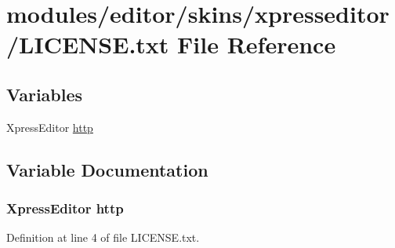 \hypertarget{LICENSE_8txt}{}\section{modules/editor/skins/xpresseditor/\+L\+I\+C\+E\+N\+SE.txt File Reference}
\label{LICENSE_8txt}
\subsection*{Variables}
\begin{DoxyCompactItemize}
\item 
Xpress\+Editor \hyperlink{LICENSE_8txt_ac4b61a1f8e5f59d19b9a24b25b336db1}{http}
\end{DoxyCompactItemize}


\subsection{Variable Documentation}
\subsubsection[{\texorpdfstring{http}{http}}]{\setlength{\rightskip}{0pt plus 5cm}Xpress\+Editor http}\hypertarget{LICENSE_8txt_ac4b61a1f8e5f59d19b9a24b25b336db1}{}\label{LICENSE_8txt_ac4b61a1f8e5f59d19b9a24b25b336db1}


Definition at line 4 of file L\+I\+C\+E\+N\+S\+E.\+txt.

